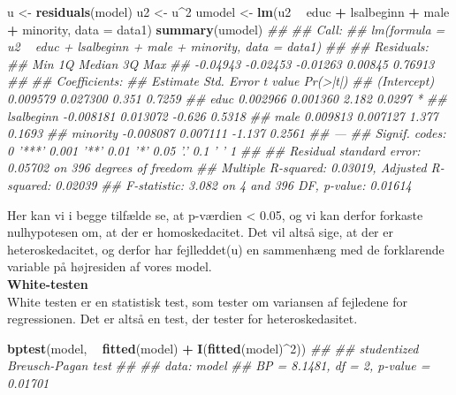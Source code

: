 \documentclass[
  10pt,
]{article}
\newenvironment{Shaded}{\begin{snugshade}}{\end{snugshade}}
\newcommand{\CommentTok}[1]{\textcolor[rgb]{0.56,0.35,0.01}{\textit{#1}}}
\newcommand{\DataTypeTok}[1]{\textcolor[rgb]{0.13,0.29,0.53}{#1}}
\newcommand{\DecValTok}[1]{\textcolor[rgb]{0.00,0.00,0.81}{#1}}
\newcommand{\KeywordTok}[1]{\textcolor[rgb]{0.13,0.29,0.53}{\textbf{#1}}}
\newcommand{\NormalTok}[1]{#1}
\newcommand{\OperatorTok}[1]{\textcolor[rgb]{0.81,0.36,0.00}{\textbf{#1}}}
\newcommand{\StringTok}[1]{\textcolor[rgb]{0.31,0.60,0.02}{#1}}
\begin{document}
\begin{Shaded}
\begin{Highlighting}[]
\NormalTok{u <-}\StringTok{ }\KeywordTok{residuals}\NormalTok{(model)}
\NormalTok{u2 <-}\StringTok{ }\NormalTok{u}\OperatorTok{^}\DecValTok{2}
\NormalTok{umodel <-}\StringTok{ }\KeywordTok{lm}\NormalTok{(u2 }\OperatorTok{~}\StringTok{ }\NormalTok{educ }\OperatorTok{+}\StringTok{ }\NormalTok{lsalbeginn }\OperatorTok{+}\StringTok{ }\NormalTok{male }\OperatorTok{+}\StringTok{ }\NormalTok{minority, }\DataTypeTok{data =}\NormalTok{ data1)}
\KeywordTok{summary}\NormalTok{(umodel)}
\CommentTok{## }
\CommentTok{## Call:}
\CommentTok{## lm(formula = u2 ~ educ + lsalbeginn + male + minority, data = data1)}
\CommentTok{## }
\CommentTok{## Residuals:}
\CommentTok{##      Min       1Q   Median       3Q      Max }
\CommentTok{## -0.04943 -0.02453 -0.01263  0.00845  0.76913 }
\CommentTok{## }
\CommentTok{## Coefficients:}
\CommentTok{##              Estimate Std. Error t value Pr(>|t|)  }
\CommentTok{## (Intercept)  0.009579   0.027300   0.351   0.7259  }
\CommentTok{## educ         0.002966   0.001360   2.182   0.0297 *}
\CommentTok{## lsalbeginn  -0.008181   0.013072  -0.626   0.5318  }
\CommentTok{## male         0.009813   0.007127   1.377   0.1693  }
\CommentTok{## minority    -0.008087   0.007111  -1.137   0.2561  }
\CommentTok{## ---}
\CommentTok{## Signif. codes:  0 '***' 0.001 '**' 0.01 '*' 0.05 '.' 0.1 ' ' 1}
\CommentTok{## }
\CommentTok{## Residual standard error: 0.05702 on 396 degrees of freedom}
\CommentTok{## Multiple R-squared:  0.03019,    Adjusted R-squared:  0.02039 }
\CommentTok{## F-statistic: 3.082 on 4 and 396 DF,  p-value: 0.01614}
\end{Highlighting}
\end{Shaded}

Her kan vi i begge tilfælde se, at p-værdien \textless{} 0.05, og vi kan
derfor forkaste nulhypotesen om, at der er homoskedacitet. Det vil altså
sige, at der er heteroskedacitet, og derfor har fejlleddet(u) en
sammenhæng med de forklarende variable på højresiden af vores model.\\
\newline  \textbf{White-testen}\\
White testen er en statistisk test, som tester om variansen af fejledene
for regressionen. Det er altså en test, der tester for heteroskedasitet.

\begin{Shaded}
\begin{Highlighting}[]
\KeywordTok{bptest}\NormalTok{(model, }\OperatorTok{~}\StringTok{ }\KeywordTok{fitted}\NormalTok{(model) }\OperatorTok{+}\StringTok{ }\KeywordTok{I}\NormalTok{(}\KeywordTok{fitted}\NormalTok{(model)}\OperatorTok{^}\DecValTok{2}\NormalTok{))}
\CommentTok{## }
\CommentTok{##  studentized Breusch-Pagan test}
\CommentTok{## }
\CommentTok{## data:  model}
\CommentTok{## BP = 8.1481, df = 2, p-value = 0.01701}
\end{Highlighting}
\end{Shaded}
\end{document}
